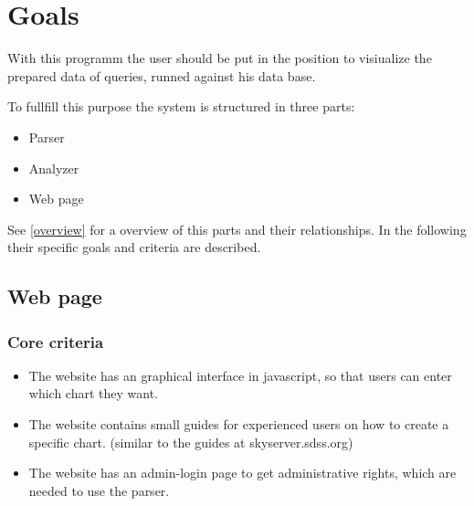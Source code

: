 \section{Goals}


With this programm the user should be put in the position 
to visiualize the prepared data of queries, runned against his data base.


To fullfill this purpose the system is structured in three parts:
\begin{itemize}
  \item Parser
  \item Analyzer
  \item Web page
\end{itemize}
See \ref{overview} for a overview of this parts and their relationships.
In the following their specific goals and criteria are described.






































\subsection{Web page}
\subsubsection{Core criteria}
\begin{itemize}
\item The website has an graphical interface in javascript, so that users can enter which chart they want.

\item The website contains small guides for experienced users on how to create a specific chart. 
(similar to the guides at skyserver.sdss.org)

\item The website has an admin-login page to get administrative rights, which are needed to use the parser.
\end{itemize}

